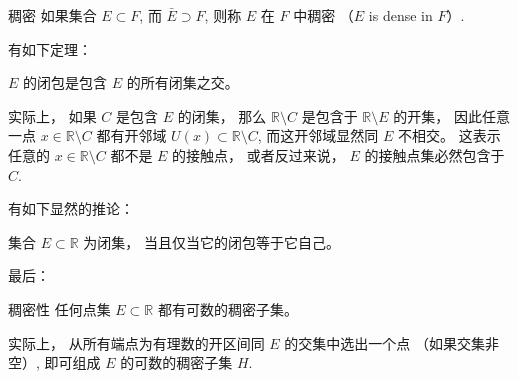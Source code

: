 \begin{definition}{稠密}
如果集合 $E\subset F$, 而 $\bar E\supset F$, 则称 $E$ 在 $F$ 中稠密 （$E$ is dense in $F$）.
\end{definition}

有如下定理：

\begin{theorem}{}
$E$ 的闭包是包含 $E$ 的所有闭集之交。
\end{theorem}
实际上， 如果 $C$ 是包含 $E$ 的闭集， 那么 $\mathbb{R}\setminus C$ 是包含于 $\mathbb{R}\setminus E$ 的开集， 因此任意一点 $x\in\mathbb{R}\setminus C$ 都有开邻域 $U(x)\subset\mathbb{R}\setminus C$, 而这开邻域显然同 $E$ 不相交。 这表示任意的 $x\in\mathbb{R}\setminus C$ 都不是 $E$ 的接触点， 或者反过来说， $E$ 的接触点集必然包含于 $C$. 

有如下显然的推论：
\begin{corollary}{}
集合 $E\subset\mathbb{R}$ 为闭集， 当且仅当它的闭包等于它自己。
\end{corollary}

最后：
\begin{theorem}{稠密性}
任何点集 $E\subset\mathbb{R}$ 都有可数的稠密子集。
\end{theorem}
实际上， 从所有端点为有理数的开区间同 $E$ 的交集中选出一个点 （如果交集非空）, 即可组成 $E$ 的可数的稠密子集 $H$.